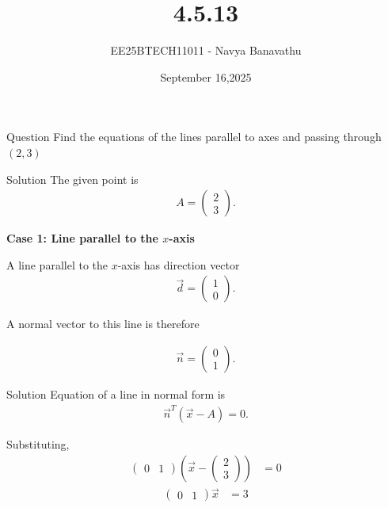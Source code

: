 \documentclass{beamer}
\title{4.5.13}
\date{September 16,2025}
\author{EE25BTECH11011 - Navya Banavathu}
\begin{document}
\frame{\titlepage}

\begin{frame}{Question}
Find the equations of the lines parallel to axes and passing through $(2, 3)$

\end{frame}

\begin{frame}{Solution}
The given point is  
\begin{align}
A = \begin{pmatrix}2 \\ 3\end{pmatrix}.
\end{align}


\textbf{Case 1: Line parallel to the $x$-axis}

 A line parallel to the $x$-axis has direction vector  
\begin{align}
\vec{d} = \begin{pmatrix}1 \\ 0\end{pmatrix}.
\end{align}

 A normal vector to this line is therefore  

\begin{align}
\vec{n} = \begin{pmatrix}0 \\ 1\end{pmatrix}.
\end{align}
\end{frame}

\begin{frame}{Solution}
Equation of a line in normal form is  
\begin{align}
\vec{n}^T(\vec{x} - A) = 0.
\end{align}

Substituting,
\begin{align}
\begin{pmatrix}0 & 1\end{pmatrix}
\left(\vec{x} - \begin{pmatrix}2 \\ 3\end{pmatrix}\right) &= 0
\end{align}
\begin{align}
\begin{pmatrix}0 & 1\end{pmatrix}\vec{x} &= 3
\end{align}

\end{frame}
\end{document}
